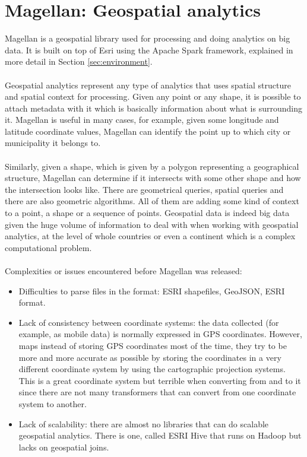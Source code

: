 \section{Magellan: Geospatial analytics}\label{sec:magellan}

Magellan \cite{magellan1} is a geospatial library used for processing and doing analytics on big data. It is built on top of Esri \cite{esri} using the Apache Spark \cite{spark} framework, explained in more detail in Section \ref{sec:environment}. 
\\
\\
Geospatial analytics represent any type of analytics that uses spatial structure and spatial context for processing. Given any point or any shape, it is possible to attach metadata with it which is basically information about what is surrounding it. Magellan is useful in many cases, for example, given some longitude and latitude coordinate values, Magellan can identify the point up to which city or municipality it belongs to. 
\\
\\
Similarly, given a shape, which is given by a polygon representing a geographical structure, Magellan can determine if it intersects with some other shape and how the intersection looks like. 
There are geometrical queries, spatial queries and there are also geometric algorithms. All of them are adding some kind of context to a point, a shape or a sequence of points.
Geospatial data is indeed big data given the huge volume of information to deal with when working with geospatial analytics, at the level of whole countries or even a continent which is a complex computational problem. 
\\
\\
Complexities or issues encountered before Magellan was released:
\begin{itemize}
    \item Difficulties to parse files in the format: ESRI shapefiles, GeoJSON, ESRI format.
    \item Lack of consistency between coordinate systems: the data collected (for example, as mobile data) is normally expressed in GPS coordinates. However, maps instead of storing GPS coordinates most of the time, they try to be more and more accurate as possible by storing the coordinates in a very different coordinate system by using the cartographic projection systems. This is a great coordinate system but terrible when converting from and to it since there are not many transformers that can convert from one coordinate system to another. 
    \item Lack of scalability: there are almost no libraries that can do scalable geospatial analytics. There is one, called ESRI Hive \cite{hive} that runs on Hadoop but lacks on geospatial joins. 
\end{itemize}

